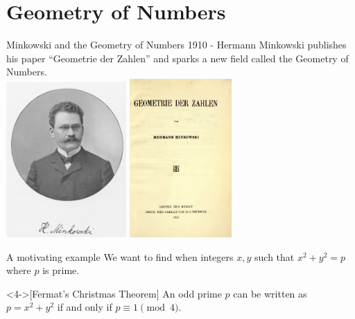 \documentclass{beamer}
\begin{document}
\section{Geometry of Numbers}
\begin{frame}{Minkowski and the Geometry of Numbers}
1910 - Hermann Minkowski publishes his paper ``Geometrie der Zahlen'' and sparks a new field called the Geometry of Numbers. \\
\includegraphics[width=130pt]{img/De_Raum_zeit_Minkowski_Bild}
\quad \quad 
\includegraphics[width=110pt]{img/GeomDerZahlen}
\end{frame}

\begin{frame}{A motivating example}
We want to find when integers $x,y$ such that $x^2 + y^2 = p$ where $p$ is prime.\\
\begin{theorem}<4->[Fermat's Christmas Theorem]
An odd prime $p$ can be written as $p = x^2 + y^2$ if and only if $p\equiv 1\pmod{4}$.
\end{theorem}
\end{frame}
\end{document}
